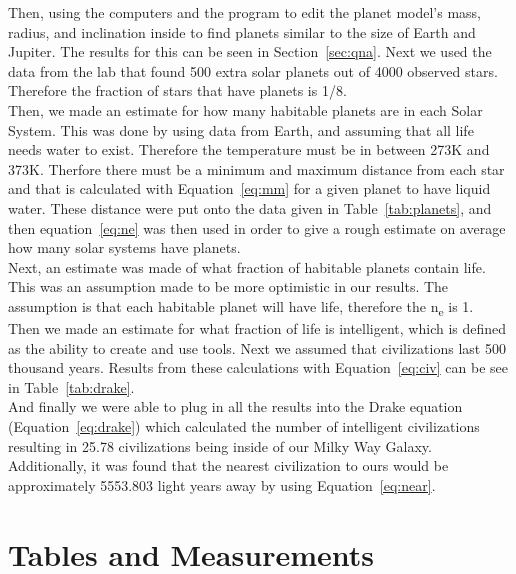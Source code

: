 \documentclass{article}
\begin{document}
Then, using the computers and the program to edit the planet model's mass, radius, and inclination inside to find planets similar to the size of Earth and Jupiter.   The results for this can be seen in Section~\ref{sec:qna}.    Next we used the data from the lab that found 500 extra solar planets out of 4000 observed stars.  Therefore the fraction of stars that have planets is 1/8.\\

Then, we made an estimate for how many habitable planets are in each Solar System.  This was done by using data from Earth, and assuming that all life needs water to exist. Therefore the temperature must be in between 273K and 373K.  Therfore there must be a minimum and maximum distance from each star and that is calculated with Equation~\ref{eq:mm} for a given
planet to have liquid water. These distance were put onto the data given in Table~\ref{tab:planets}, and then equation~\ref{eq:ne} was then used in order to give 
a rough estimate on average how many solar systems have planets. \\

Next, an estimate was made of what fraction of habitable planets contain life.  This was an assumption made to be more optimistic in our results.  The assumption is that each habitable planet will have life, therefore the n\textsubscript{e} is 1.\\

Then we made an estimate for what fraction of life is intelligent, which is defined as the ability to create and use tools.  Next we assumed that civilizations last 500 thousand years.  Results from these calculations with Equation~\ref{eq:civ} can be see in Table~\ref{tab:drake}.\\

And finally we were able to plug in all the results into the Drake equation (Equation~\ref{eq:drake}) which calculated the number of intelligent civilizations resulting in 25.78 civilizations being inside of our Milky Way Galaxy. Additionally, it was found that the nearest civilization to ours would be approximately 5553.803 light years away by using Equation~\ref{eq:near}.\\


\section{Tables and Measurements}
\label{sec:tnm}
\end{document}
